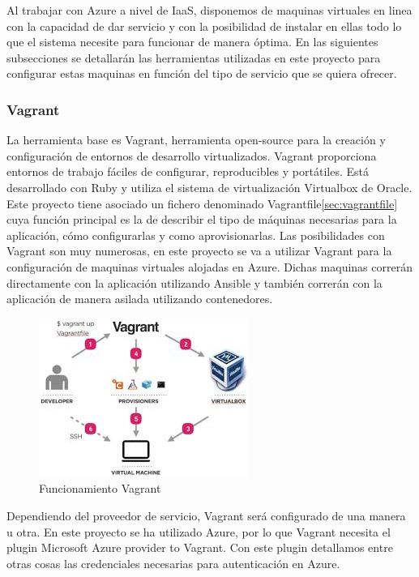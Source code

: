 \documentclass[a4paper,11pt]{book}
\begin{document}
Al trabajar con Azure a nivel de IaaS, disponemos de maquinas virtuales en linea con la capacidad de dar servicio y con la posibilidad de instalar en ellas todo lo que el sistema necesite para funcionar de manera óptima. En las siguientes subsecciones se detallarán las herramientas utilizadas en este proyecto para configurar estas maquinas en función del tipo de servicio que se quiera ofrecer. 

\subsubsection{Vagrant}

La herramienta base es Vagrant\cite{vg}, herramienta open-source para la creación y configuración de entornos de desarrollo virtualizados. Vagrant proporciona entornos de trabajo fáciles de configurar, reproducibles y portátiles. Está desarrollado con Ruby y utiliza el sistema de virtualización Virtualbox de Oracle. Este proyecto tiene asociado un fichero denominado Vagrantfile\ref{sec:vagrantfile} cuya función principal es la de describir el tipo de máquinas necesarias para la aplicación, cómo configurarlas y como aprovisionarlas. Las posibilidades con Vagrant son muy numerosas, en este proyecto se va a utilizar Vagrant para la configuración de maquinas virtuales alojadas en Azure. Dichas maquinas correrán directamente con la aplicación utilizando Ansible y también correrán con la aplicación de manera asilada utilizando contenedores. 

\begin{figure}[H] 
\centering 
\includegraphics[scale=0.95]{imagenes/desarrollo_herramienta/vagrant.jpeg}
\caption{ Funcionamiento Vagrant\cite{vg2}}
\end{figure}


Dependiendo del proveedor de servicio, Vagrant será configurado de una manera u otra. En este proyecto se ha utilizado Azure, por lo que Vagrant necesita el plugin Microsoft Azure provider to Vagrant. Con este plugin detallamos entre otras cosas las credenciales necesarias para autenticación en Azure.
\end{document}
